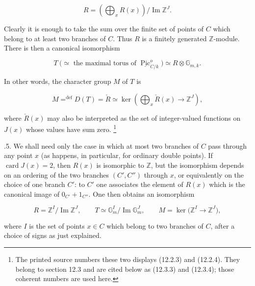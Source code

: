 \begin{equation}\tag{12.3.2}
 R=\left(\bigoplus_x R(x)\right)/\operatorname{Im}\mathbb Z^J.
\end{equation}

\noindent
Clearly it is enough to take the sum over the finite set of points of $C$
which belong to at least two branches of $C$. Thus $R$ is a finitely
generated $\mathbb Z$-module. There is then a canonical isomorphism

\begin{equation}\tag{12.3.3}
 T\ \bigl(\simeq\text{ the maximal torus of }
       \underline{\operatorname{Pic}}^o_{C/k}\bigr)
 \simeq R\otimes\mathbb G_{m,k}.
\end{equation}

\noindent
In other words, the character group $M$ of $T$ is

\begin{equation}\tag{12.3.4}
 M\mathrel{\mathop{=}^{\mathrm{def}}}D(T)=\check R
 \simeq\ker\left(\bigoplus_x\check R(x)\longrightarrow\mathbb Z^J\right),
\end{equation}

\noindent
where $\check R(x)$ may also be interpreted as the set of
integer-valued functions on $J(x)$ whose values have sum zero.
\footnote{The printed source numbers these two displays (12.2.3) and
(12.2.4). They belong to section 12.3 and are cited below as (12.3.3) and
(12.3.4); those coherent numbers are used here.}

\medskip
{}.5. We shall need only the case in which at most two branches of $C$
pass through any point $x$ (as happens, in particular, for ordinary double
points). If $\operatorname{card}J(x)=2$, then $R(x)$ is isomorphic to
$\mathbb Z$, but the isomorphism depends on an ordering of the two branches
$(C',C'')$ through $x$, or equivalently on the choice of one branch $C'$:
to $C'$ one associates the element of $R(x)$ which is the canonical image
of $0_{C'}+1_{C''}$. One then obtains an isomorphism

\begin{equation}\tag{12.3.6}
 R=\mathbb Z^I/\operatorname{Im}\mathbb Z^J,
 \qquad
 T\simeq\mathbb G_m^I/\operatorname{Im}\mathbb G_m^J,
 \qquad
 M=\ker\bigl(\mathbb Z^I\longrightarrow\mathbb Z^J\bigr),
\end{equation}

\noindent
where $I$ is the set of points $x\in C$ which belong to two branches of
$C$, after a choice of signs as just explained.

